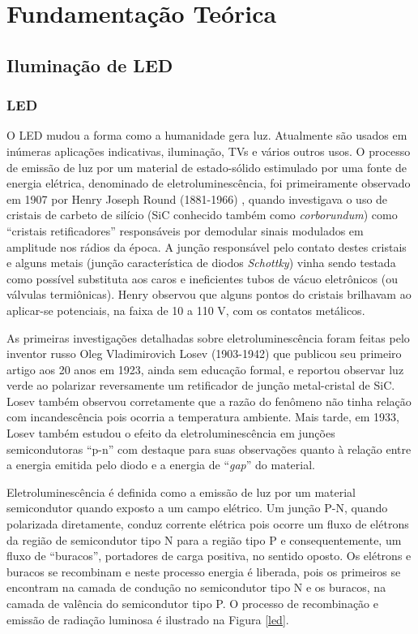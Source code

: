 \chapter{Fundamentação Teórica}

\section{Iluminação de LED}

\subsection{LED}

O LED mudou a forma como a humanidade gera luz. Atualmente são usados em inúmeras aplicações indicativas, iluminação, TVs e vários outros usos. O processo de emissão de luz por um material de estado-sólido estimulado por uma fonte de energia elétrica, denominado de eletroluminescência, foi primeiramente observado em 1907 por Henry Joseph Round (1881-1966) \cite{led}, quando investigava o uso de cristais de carbeto de silício (SiC conhecido também como \textit{corborundum}) como ``cristais retificadores'' responsáveis por demodular sinais modulados em amplitude nos rádios da época. A junção responsável pelo contato destes cristais e alguns metais (junção característica de diodos \textit{Schottky}) vinha sendo testada como possível substituta aos caros e ineficientes tubos de vácuo eletrônicos (ou válvulas termiônicas). Henry observou que alguns pontos do cristais brilhavam ao aplicar-se potenciais, na faixa de 10 a 110 V, com os contatos metálicos.

As primeiras investigações detalhadas sobre eletroluminescência foram feitas pelo inventor russo Oleg Vladimirovich Losev (1903-1942) que publicou seu primeiro artigo aos 20 anos em 1923, ainda sem educação formal, e reportou observar luz verde ao polarizar reversamente um retificador de junção metal-cristal de SiC. Losev também observou corretamente que a razão do fenômeno não tinha relação com incandescência pois ocorria a temperatura ambiente. Mais tarde, em 1933, Losev também estudou o efeito da eletroluminescência em junções semicondutoras ``p-n'' com destaque para suas observações quanto à relação entre a energia emitida pelo diodo e a energia de ``\textit{gap}'' do material.

Eletroluminescência é definida como a emissão de luz por um material semicondutor quando exposto a um campo elétrico. Um junção P-N, quando polarizada diretamente, conduz corrente elétrica pois ocorre um fluxo de elétrons da região de semicondutor tipo N para a região tipo P e consequentemente, um fluxo de ``buracos'', portadores de carga positiva, no sentido oposto. Os elétrons e buracos se recombinam e neste processo energia é liberada, pois os primeiros se encontram na camada de condução no semicondutor tipo N e os buracos, na camada de valência do semicondutor tipo P. O processo de recombinação e emissão de radiação luminosa é ilustrado na Figura \ref{led}.

